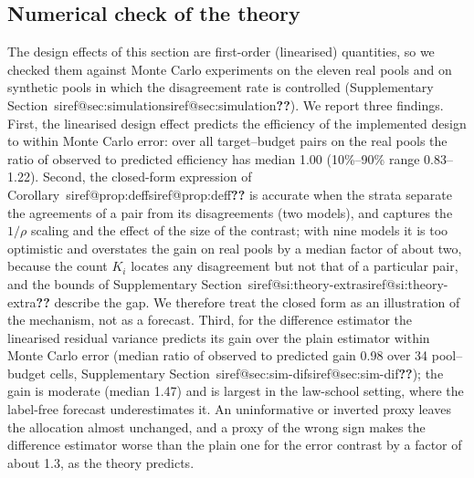\documentclass[pdflatex,sn-mathphys-num,iicol]{sn-jnl}
\makeatletter
\theoremstyle{thmstyleone}
\theoremstyle{thmstyletwo}
\theoremstyle{thmstylethree}
\newcommand{\SIref}[1]{\ifcsname siref@#1\endcsname\csname siref@#1\endcsname\else\textbf{??}\fi}
\makeatother
\begin{document}
\subsection{Numerical check of the theory}\label{sec:numcheck}
The design effects of this section are first-order (linearised) quantities, so we checked them against Monte Carlo experiments on the eleven real pools and on synthetic pools in which the disagreement rate is controlled (Supplementary Section~\SIref{sec:simulation}). We report three findings. First, the linearised design effect predicts the efficiency of the implemented design to within Monte Carlo error: over all target--budget pairs on the real pools the ratio of observed to predicted efficiency has median 1.00 (10\%--90\% range 0.83--1.22). Second, the closed-form expression of Corollary~\SIref{prop:deff} is accurate when the strata separate the agreements of a pair from its disagreements (two models), and captures the $1/\rho$ scaling and the effect of the size of the contrast; with nine models it is too optimistic and overstates the gain on real pools by a median factor of about two, because the count $K_i$ locates any disagreement but not that of a particular pair, and the bounds of Supplementary Section~\SIref{si:theory-extra} describe the gap. We therefore treat the closed form as an illustration of the mechanism, not as a forecast. Third, for the difference estimator the linearised residual variance predicts its gain over the plain estimator within Monte Carlo error (median ratio of observed to predicted gain 0.98 over 34 pool--budget cells, Supplementary Section~\SIref{sec:sim-dif}); the gain is moderate (median 1.47) and is largest in the law-school setting, where the label-free forecast underestimates it. An uninformative or inverted proxy leaves the allocation almost unchanged, and a proxy of the wrong sign makes the difference estimator worse than the plain one for the error contrast by a factor of about 1.3, as the theory predicts.

\makeatletter
{}
\makeatother
\end{document}
